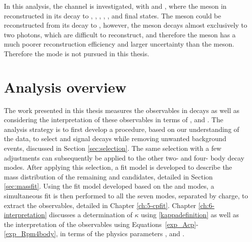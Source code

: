In this analysis, the \decay{\Bm}{\D\Kstarm} channel is investigated, with \decay{\Kstarm}{\KS\pim} and \decay{\KS}{\pim\pip}, where the \Dz meson in reconstructed in its decay to \Km\pip, \Kp\Km, \pip\pim, \Kp\pim, \Km\pip\pim\pip, \pip\pim\pip\pim and \Kp\pim\pip\pim final states. The \Kstarm meson could be reconstructed from its decay to \Km\piz, however, the \piz meson decays almost exclusively to two photons, which are difficult to reconstruct, and therefore the \piz meson has a much poorer reconstruction efficiency and larger uncertainty than the \KS meson. Therefore the \Km\piz mode is not pursued in this thesis.

\section{Analysis overview}

The work presented in this thesis measures the \CP observables in \decay{\Bm}{\D\Kstarm} decays as well as considering the interpretation of these observables in terms of \rb, \deltab and \Pgamma. The analysis strategy is to first develop a procedure, based on our understanding of the data, to select \decay{\Bm}{\D(\Km\pip)\Kstarm} and \kpipipi signal decays while removing unwanted background events, discussed in Section \ref{sec:selection}. The same selection with a few adjustments can subsequently be applied to the other two- and four- body \D decay modes. After applying this selection, a fit model is developed to describe the \B mass distribution of the remaining \decay{\Bm}{\D(\Km\pip)\Kstarm} and \kpipipi candidates, detailed in Section \ref{sec:massfit}. Using the fit model developed based on the \kpi and \kpipipi modes, a simultaneous fit is then performed to all the seven \D modes, separated by \B charge, to extract the \CP observables, detailed in Chapter \ref{ch:5-cpfit}. Chapter \ref{ch:6-interpretation} discusses a determination of $\kappa$ using \eqn\ref{kappadefinition} as well as the interpretation of the \CP observables using Equations~\ref{exp_Acp}-\ref{exp_Rpm4body}, in terms of the physics parameters \rb, \deltab and \Pgamma.
